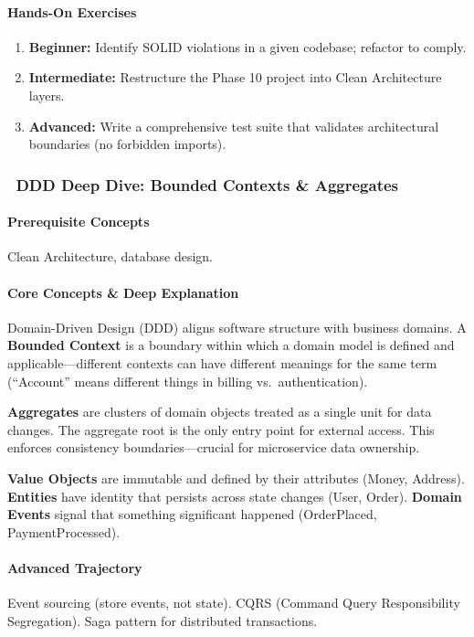 \documentclass[11pt, a4paper, oneside]{report}
\newcommand{\mustmaster}[1]{\subsubsection{\texorpdfstring{\fcolorbox{blue!40!black}{blue!8}{\footnotesize\bfseries\color{blue!40!black} MUST MASTER}~#1}{#1}}}
\begin{document}
\paragraph{Hands-On Exercises}
\begin{enumerate}[leftmargin=*]
\item \textbf{Beginner:} Identify SOLID violations in a given codebase; refactor to comply.
\item \textbf{Intermediate:} Restructure the Phase 10 project into Clean Architecture layers.
\item \textbf{Advanced:} Write a comprehensive test suite that validates architectural boundaries (no forbidden imports).
\end{enumerate}

\mustmaster{DDD Deep Dive: Bounded Contexts \& Aggregates}

\paragraph{Prerequisite Concepts} Clean Architecture, database design.

\paragraph{Core Concepts \& Deep Explanation} Domain-Driven Design (DDD) aligns software structure with business domains. A \textbf{Bounded Context} is a boundary within which a domain model is defined and applicable---different contexts can have different meanings for the same term (``Account'' means different things in billing vs.\ authentication).

\textbf{Aggregates} are clusters of domain objects treated as a single unit for data changes. The aggregate root is the only entry point for external access. This enforces consistency boundaries---crucial for microservice data ownership.

\textbf{Value Objects} are immutable and defined by their attributes (Money, Address). \textbf{Entities} have identity that persists across state changes (User, Order). \textbf{Domain Events} signal that something significant happened (OrderPlaced, PaymentProcessed).

\paragraph{Advanced Trajectory} Event sourcing (store events, not state). CQRS (Command Query Responsibility Segregation). Saga pattern for distributed transactions.
\end{document}
